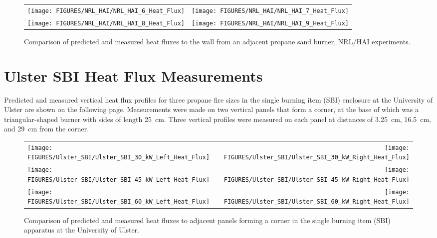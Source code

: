 \begin{figure}[p]
\begin{tabular*}{\textwidth}{l@{\extracolsep{\fill}}r}
\texttt{[image: FIGURES/NRL\_HAI/NRL\_HAI\_6\_Heat\_Flux]} &
\texttt{[image: FIGURES/NRL\_HAI/NRL\_HAI\_7\_Heat\_Flux]} \\
\texttt{[image: FIGURES/NRL\_HAI/NRL\_HAI\_8\_Heat\_Flux]} &
\texttt{[image: FIGURES/NRL\_HAI/NRL\_HAI\_9\_Heat\_Flux]}
\end{tabular*}
\label{NRL_HAI_2}
\caption[Wall heat flux predictions, NRL/HAI experiments.]
{Comparison of predicted and measured heat fluxes to the wall from an adjacent propane sand burner, NRL/HAI experiments.}
\end{figure}



\clearpage

\section{Ulster SBI Heat Flux Measurements}

Predicted and measured vertical heat flux profiles for three propane fire sizes in the single burning item (SBI) enclosure at the University of Ulster are shown on the following page. Measurements were made on two vertical panels that form a corner, at the base of which was a triangular-shaped burner with sides of length 25~cm. Three vertical profiles were measured on each panel at distances of 3.25~cm, 16.5~cm, and 29~cm from the corner.

\begin{figure}[h!]
\begin{tabular*}{\textwidth}{l@{\extracolsep{\fill}}r}
\texttt{[image: FIGURES/Ulster\_SBI/Ulster\_SBI\_30\_kW\_Left\_Heat\_Flux]} &
\texttt{[image: FIGURES/Ulster\_SBI/Ulster\_SBI\_30\_kW\_Right\_Heat\_Flux]} \\
\texttt{[image: FIGURES/Ulster\_SBI/Ulster\_SBI\_45\_kW\_Left\_Heat\_Flux]} &
\texttt{[image: FIGURES/Ulster\_SBI/Ulster\_SBI\_45\_kW\_Right\_Heat\_Flux]} \\
\texttt{[image: FIGURES/Ulster\_SBI/Ulster\_SBI\_60\_kW\_Left\_Heat\_Flux]} &
\texttt{[image: FIGURES/Ulster\_SBI/Ulster\_SBI\_60\_kW\_Right\_Heat\_Flux]}
\end{tabular*}
\label{Ulster_SBI}
\caption[Corner heat flux predictions, Ulster SBI experiments]
{Comparison of predicted and measured heat fluxes to adjacent panels forming a corner in the single
burning item (SBI) apparatus at the University of Ulster.}
\end{figure}

